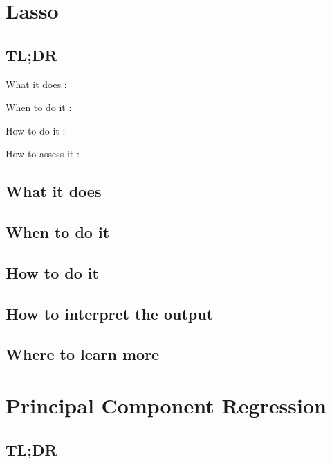 \documentclass[
]{book}
\begin{document}
\hypertarget{lasso}{%
\chapter{Lasso}\label{lasso}}

\hypertarget{tldr-14}{%
\section{TL;DR}\label{tldr-14}}

What it does
:

When to do it
:

How to do it
:

How to assess it
:

\hypertarget{what-it-does-14}{%
\section{What it does}\label{what-it-does-14}}

\hypertarget{when-to-do-it-14}{%
\section{When to do it}\label{when-to-do-it-14}}

\hypertarget{how-to-do-it-14}{%
\section{How to do it}\label{how-to-do-it-14}}

\hypertarget{how-to-interpret-the-output-14}{%
\section{How to interpret the output}\label{how-to-interpret-the-output-14}}

\hypertarget{where-to-learn-more-14}{%
\section{Where to learn more}\label{where-to-learn-more-14}}

\hypertarget{principal-component-regression}{%
\chapter{Principal Component Regression}\label{principal-component-regression}}

\hypertarget{tldr-15}{%
\section{TL;DR}\label{tldr-15}}
\end{document}
